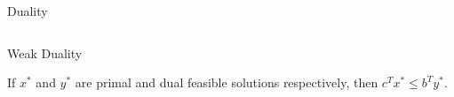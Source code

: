 \begin{frame}{Duality}

  \begin{columns}
    \begin{column}{.5\textwidth}
      
    \end{column}
    \begin{column}{.5\textwidth}
      
    \end{column}       
  \end{columns}
\end{frame}





\begin{frame}{Weak Duality}
\begin{theorem}
  If $x^*$ and $y^*$ are primal and dual feasible solutions respectively, then
  $c^Tx^* \leq b^Ty^*$. 
\end{theorem}

  \begin{columns}
    \begin{column}{.5\textwidth}
      
    \end{column}
    \begin{column}{.5\textwidth}
      
    \end{column}       
  \end{columns}
\end{frame}





\begin{frame}{}

  \begin{columns}
    \begin{column}{.5\textwidth}
      
    \end{column}
    \begin{column}{.5\textwidth}
      
    \end{column}       
  \end{columns}
\end{frame}





